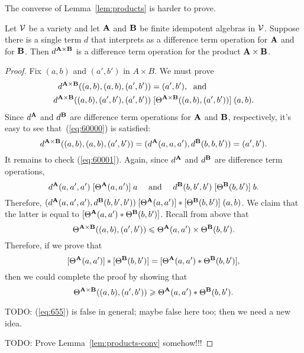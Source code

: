 The converse of Lemma~\ref{lem:products} is harder to prove.
\begin{lem}
  \label{lem:products-conv}
 Let $\mathcal{V}$ be a variety and let $\mathbf{A}$ and $\mathbf{B}$ be finite idempotent
 algebras in $\mathcal{V}$. Suppose there is a single term $d$ that
 interprets as a difference term operation for $\mathbf{A}$ and for $\mathbf{B}$.
 Then $d^{\mathbf{A} \times \mathbf{B}}$ is a difference term operation for the product
 $\mathbf{A} \times \mathbf{B}$.
\end{lem}
\begin{proof}
  Fix $(a, b)$ and $(a', b')$ in $A \times B$.
  We must prove
  \begin{align}
    d^{\mathbf{A} \times \mathbf{B}}((a, b), (a, b), (a', b')) &= (a', b'),\; \text{ and } \label{eq:60000}\\
    d^{\mathbf{A} \times \mathbf{B}}((a, b), (a', b'), (a', b'))
    &\mathrel{[\Theta^{\mathbf{A} \times \mathbf{B}}((a, b), (a', b'))]} (a, b). \label{eq:60001}
  \end{align}
  Since $d^{\mathbf{A}}$ and $d^{\mathbf{B}}$ are difference term operations for $\mathbf{A}$ and
  $\mathbf{B}$, respectively, it's easy to see that~(\ref{eq:60000}) is satisfied:
  \[
  d^{\mathbf{A} \times \mathbf{B}}((a, b), (a, b), (a', b')) =
  (d^{\mathbf{A}}(a, a, a'),  d^{\mathbf{B}}(b, b, b')) = (a', b').
  \]
  It remains to check (\ref{eq:60001}).
  Again, since $d^{\mathbf{A}}$ and
  $d^{\mathbf{B}}$ are difference term operations,
  \[
  d^{\mathbf{A}}(a,a',a')
  \mathrel{[\Theta^{\mathbf{A}}(a,a')]} a \quad \text{ and } \quad
  d^{\mathbf{B}}(b, b', b')
  \mathrel{[\Theta^{\mathbf{B}}(b,b')]} b.
  \]
  Therefore, 
  $(d^{\mathbf{A}}(a,a',a'),d^{\mathbf{B}}(b, b', b'))
    \mathrel{[\Theta^{\mathbf{A}}(a,a')]\ast[\Theta^{\mathbf{B}}(b,b')]}
    (a,b)$.
  We claim that the latter is equal to
  $[\Theta^{\mathbf{A}}(a,a') \ast \Theta^{\mathbf{B}}(b,b')]$.
  Recall from above that
  \[
  \Theta^{\mathbf{A} \times \mathbf{B}}((a, b), (a', b'))\leqslant \Theta^{\mathbf{A}}(a,a') \times \Theta^{\mathbf{B}}(b,b').
  \]
  Therefore, if we prove that
  \[
  [\Theta^{\mathbf{A}}(a,a')]  \ast  [\Theta^{\mathbf{B}}(b,b')] = 
  [\Theta^{\mathbf{A}}(a,a') \ast \Theta^{\mathbf{B}}(b,b')],
  \]
  then we could complete the proof by showing that
  \begin{equation}
    \label{eq:655}    
  \Theta^{\mathbf{A} \times \mathbf{B}}((a, b), (a', b'))\geqslant \Theta^{\mathbf{A}}(a,a') \ast \Theta^{\mathbf{B}}(b,b').
  \end{equation}

  \smallskip

  TODO: (\ref{eq:655}) is false in general; maybe false here
  too; then we need a new idea.

  \medskip
  
  TODO: Prove Lemma~\ref{lem:products-conv} somehow!!!
\end{proof}


